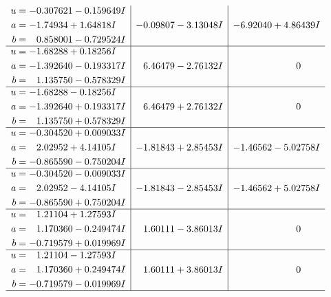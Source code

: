 \documentclass[1p]{elsarticle_modified}
\theoremstyle{definition}
\begin{document}
$$\begin{array}{c|c|c}
\begin{aligned}
u &= -0.307621 - 0.159649 I \\
a &= -1.74934 + 1.64818 I \\
b &= \phantom{-}0.858001 - 0.729524 I\end{aligned}
 & -0.09807 - 3.13048 I & -6.92040 + 4.86439 I \\ \hline\begin{aligned}
u &= -1.68288 + 0.18256 I \\
a &= -1.392640 - 0.193317 I \\
b &= \phantom{-}1.135750 - 0.578329 I\end{aligned}
 & \phantom{-}6.46479 - 2.76132 I & \phantom{-0.000000 } 0 \\ \hline\begin{aligned}
u &= -1.68288 - 0.18256 I \\
a &= -1.392640 + 0.193317 I \\
b &= \phantom{-}1.135750 + 0.578329 I\end{aligned}
 & \phantom{-}6.46479 + 2.76132 I & \phantom{-0.000000 } 0 \\ \hline\begin{aligned}
u &= -0.304520 + 0.009033 I \\
a &= \phantom{-}2.02952 + 4.14105 I \\
b &= -0.865590 - 0.750204 I\end{aligned}
 & -1.81843 + 2.85453 I & -1.46562 - 5.02758 I \\ \hline\begin{aligned}
u &= -0.304520 - 0.009033 I \\
a &= \phantom{-}2.02952 - 4.14105 I \\
b &= -0.865590 + 0.750204 I\end{aligned}
 & -1.81843 - 2.85453 I & -1.46562 + 5.02758 I \\ \hline\begin{aligned}
u &= \phantom{-}1.21104 + 1.27593 I \\
a &= \phantom{-}1.170360 - 0.249474 I \\
b &= -0.719579 + 0.019969 I\end{aligned}
 & \phantom{-}1.60111 - 3.86013 I & \phantom{-0.000000 } 0 \\ \hline\begin{aligned}
u &= \phantom{-}1.21104 - 1.27593 I \\
a &= \phantom{-}1.170360 + 0.249474 I \\
b &= -0.719579 - 0.019969 I\end{aligned}
 & \phantom{-}1.60111 + 3.86013 I & \phantom{-0.000000 } 0\\
 \hline 
 \end{array}$$\newpage
\end{document}
